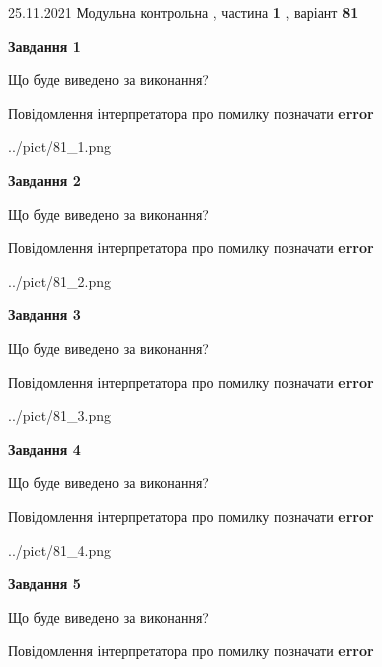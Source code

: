\documentclass[10pt, ukrainian]{article}
\begin{document}
{25.11.2021 Модульна контрольна , частина \textbf { 1 }, варіант  \No \textbf { 81 }\par}
{
\begin {large}

{\begin {center}\textbf{Завдання 1}\end {center}}\par
Що буде виведено за виконання? \par
Повідомлення інтерпретатора про помилку позначати \textbf{error}

\begin{center}
	{../pict/81_1.png}
\end{center}
\newpage

{\begin {center}\textbf{Завдання 2}\end {center}}\par
Що буде виведено за виконання? \par
Повідомлення інтерпретатора про помилку позначати \textbf{error}

\begin{center}
	{../pict/81_2.png}
\end{center}
\newpage

{\begin {center}\textbf{Завдання 3}\end {center}}\par
Що буде виведено за виконання? \par
Повідомлення інтерпретатора про помилку позначати \textbf{error}

\begin{center}
	{../pict/81_3.png}
\end{center}
\newpage

{\begin {center}\textbf{Завдання 4}\end {center}}\par
Що буде виведено за виконання? \par
Повідомлення інтерпретатора про помилку позначати \textbf{error}

\begin{center}
	{../pict/81_4.png}
\end{center}
\newpage

{\begin {center}\textbf{Завдання 5}\end {center}}\par
Що буде виведено за виконання? \par
Повідомлення інтерпретатора про помилку позначати \textbf{error}


\end{large}}
\end{document}
